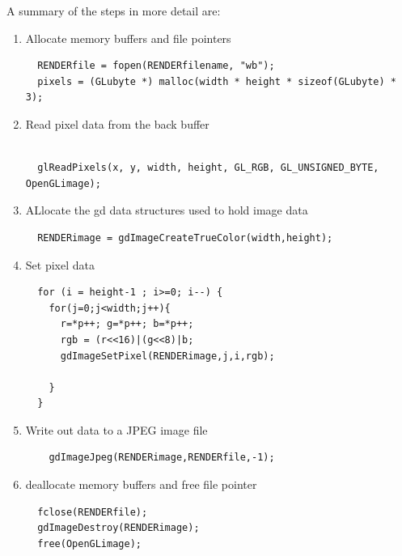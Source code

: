 \documentclass[11pt,twoside]{book}
\begin{document}
A summary of the steps in more detail are:
\begin{enumerate}
\item Allocate memory buffers and file pointers
\begin{verbatim}
  RENDERfile = fopen(RENDERfilename, "wb");
  pixels = (GLubyte *) malloc(width * height * sizeof(GLubyte) * 3);
\end{verbatim}

\item Read pixel data from the back buffer
\begin{verbatim}

  glReadPixels(x, y, width, height, GL_RGB, GL_UNSIGNED_BYTE, OpenGLimage);
\end{verbatim}
\item ALlocate the gd data structures used to hold image data
\begin{verbatim}
  RENDERimage = gdImageCreateTrueColor(width,height);
\end{verbatim}

\item Set pixel data

\begin{verbatim}
  for (i = height-1 ; i>=0; i--) {
    for(j=0;j<width;j++){
      r=*p++; g=*p++; b=*p++;
      rgb = (r<<16)|(g<<8)|b;
      gdImageSetPixel(RENDERimage,j,i,rgb);

    }
  }
\end{verbatim}

\item Write out data to a JPEG image file

\begin{verbatim}
    gdImageJpeg(RENDERimage,RENDERfile,-1);
\end{verbatim}

\item deallocate memory buffers and free file pointer

\begin{verbatim}
  fclose(RENDERfile);
  gdImageDestroy(RENDERimage);
  free(OpenGLimage);
\end{verbatim}

\end{enumerate}










\end{document}
